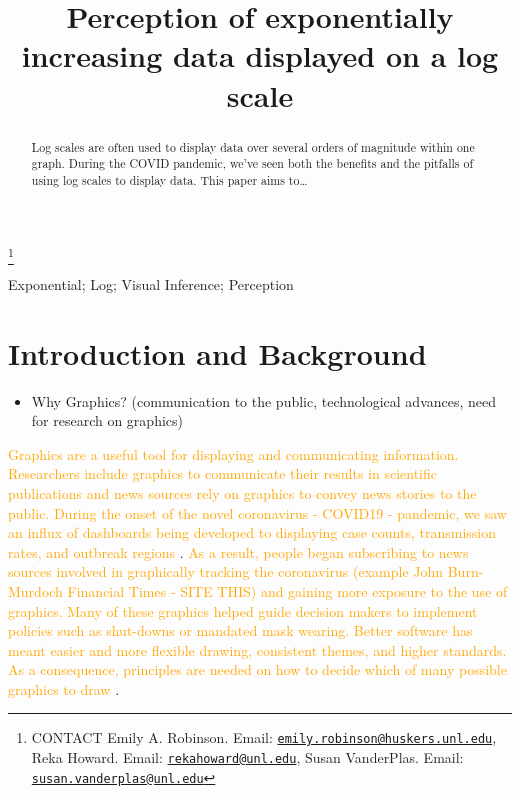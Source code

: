 \documentclass[]{interact}
\theoremstyle{plain}%
\theoremstyle{definition}
\theoremstyle{remark}
\def\tightlist{}
\begin{document}

\title{Perception of exponentially increasing data displayed on a log scale}


\author{
}

\thanks{CONTACT Emily A. Robinson. Email: \href{mailto:emily.robinson@huskers.unl.edu}{\nolinkurl{emily.robinson@huskers.unl.edu}}, Reka Howard. Email: \href{mailto:rekahoward@unl.edu}{\nolinkurl{rekahoward@unl.edu}}, Susan VanderPlas. Email: \href{mailto:susan.vanderplas@unl.edu}{\nolinkurl{susan.vanderplas@unl.edu}}}

\maketitle

\begin{abstract}
Log scales are often used to display data over several orders of
magnitude within one graph. During the COVID pandemic, we've seen both
the benefits and the pitfalls of using log scales to display data. This
paper aims to\ldots{}
\end{abstract}

\begin{keywords}
Exponential; Log; Visual Inference; Perception
\end{keywords}

\hypertarget{introduction-and-background}{%
\section{Introduction and
Background}\label{introduction-and-background}}

\begin{itemize}
\tightlist
\item
  Why Graphics? (communication to the public, technological advances,
  need for research on graphics)
\end{itemize}

\textcolor{Orange}{Graphics are a useful tool for displaying and communicating information. Researchers include graphics to communicate their results in scientific publications and news sources rely on graphics to convey news stories to the public. During the onset of the novel coronavirus - COVID19 - pandemic, we saw an influx of dashboards being developed to displaying case counts, transmission rates, and outbreak regions}
\citep{lisa_charlotte_2020}.
\textcolor{Orange}{As a result, people began subscribing to news sources involved in graphically tracking the coronavirus (example John Burn-Murdoch Financial Times - SITE THIS) and gaining more exposure to the use of graphics. Many of these graphics helped guide decision makers to implement policies such as shut-downs or mandated mask wearing. Better software has meant easier and more flexible drawing, consistent themes, and higher standards. As a consequence, principles are needed on how to decide which of many possible graphics to draw}
\citep{unwin_why_2020}.
\end{document}
